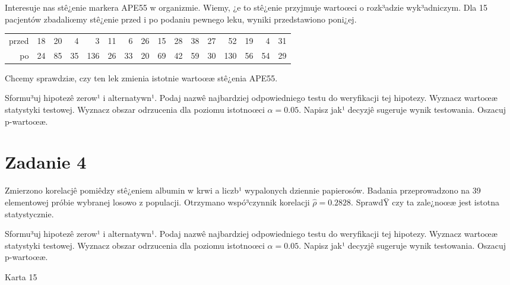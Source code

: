 \documentclass[a4paper,12pt]{article}
\begin{document}
  Interesuje nas stê¿enie markera APE55  w organizmie. 
  Wiemy, ¿e to stê¿enie przyjmuje wartoœci o rozk³adzie wyk³adniczym. 
  Dla 15 pacjentów zbadaliœmy stê¿enie przed i po podaniu pewnego leku, 
  wyniki przedstawiono poni¿ej.
  
  \vspace{0.5cm} 
  \noindent\begin{center} 
\begin{tabular}{rrrrrrrrrrrrrrrr}
  \hline
  \hline
przed & 18 & 20 & 4 & 3 & 11 & 6 & 26 & 15 & 28 & 38 & 27 & 52 & 19 & 4 & 31 \\
  po & 24 & 85 & 35 & 136 & 26 & 33 & 20 & 69 & 42 & 59 & 30 & 130 & 56 & 54 & 29 \\
   \hline
\end{tabular}
 
  \end{center} 
  \vspace{0.5cm}
  
  Chcemy sprawdziæ, czy ten lek zmienia istotnie wartoœæ stê¿enia APE55.
  
  Sformu³uj hipotezê zerow¹ i alternatywn¹. 
  Podaj nazwê najbardziej odpowiedniego testu do weryfikacji tej hipotezy. 
  Wyznacz wartoœæ statystyki testowej. 
  Wyznacz obszar odrzucenia dla poziomu istotnoœci $\alpha=0.05$. 
  Napisz jak¹ decyzjê sugeruje wynik testowania. Oszacuj p-wartoœæ. \vspace{1cm} 

  \section*{Zadanie 4}
     
     Zmierzono korelacjê pomiêdzy stê¿eniem albumin w krwi a liczb¹ wypalonych dziennie papierosów. 
     Badania przeprowadzono na 39 elementowej próbie wybranej losowo z populacji. 
     Otrzymano wspó³czynnik korelacji $\hat\rho = 0.2828 $. 
     SprawdŸ czy ta zale¿noœæ jest istotna statystycznie. 
     
     Sformu³uj hipotezê zerow¹ i alternatywn¹. 
     Podaj nazwê najbardziej odpowiedniego testu do weryfikacji tej hipotezy. 
     Wyznacz wartoœæ statystyki testowej. 
     Wyznacz obszar odrzucenia dla poziomu istotnoœci $\alpha=0.05$. 
     Napisz jak¹ decyzjê sugeruje wynik testowania. 
     Oszacuj p-wartoœæ. \vspace{1cm} 

  \clearpage  Karta  15  
\end{document}
